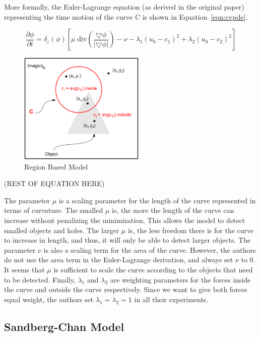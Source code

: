 \documentclass[10pt,twocolumn,letterpaper]{article}
\begin{document}
More formally, the Euler-Lagrange equation (as derived in the original paper) representing the time motion of the curve C is shown in Equation~\ref{eqn:cvpde}.

\begin{equation}
\label{eqn:cvpde}
\frac{\partial{\phi}}{\partial{t}} = \delta_{\varepsilon}(\phi)[\mu\; \mathrm{div}(\frac{\bigtriangledown \phi}{|\bigtriangledown \phi|}) - \nu -
\lambda_{1}(u_{0} - c_{1})^2 +\lambda_{2}(u_{0} - c_{2})^2] 
\end{equation}

\begin{figure}[t]
\centering
\includegraphics[width=6cm]{explaining.png}
\caption{Region Based Model}
\label{fig:region}
\end{figure}

(REST OF EQUATION HERE)

The parameter $\mu$ is a scaling parameter for the length of the curve represented in terms of curvature. The smalled $\mu$ is, the more the length of the curve
can increase without penalizing the minimization. This allows the model to detect smalled objects and holes. The larger $\mu$ is, the less freedom there is for
the curve to increase in length, and thus, it will only be able to detect larger objects. The parameter $\nu$ is also a scaling term for the area of the curve.
However, the authors do not use the area term in the Euler-Lagrange derivation, and always set $\nu$ to 0. It seems that $\mu$ is sufficient to scale the curve
according to the objects that need to be detected. Finally, $\lambda_{1}$ and $\lambda_{2}$ are weighting parameters for the forces inside the curve and
outside the curve respectively. Since we want to give both forces equal weight, the authors set $\lambda_{1} = \lambda_{2} = 1$ in all their experiments.



\subsection{Sandberg-Chan Model}
\label{sec:sandberg-chan}
\end{document}
